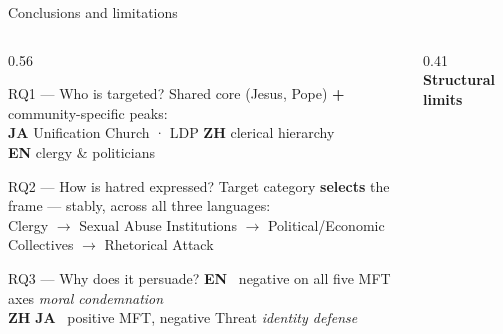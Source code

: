 \documentclass[aspectratio=169,10pt]{beamer}
\newcommand{\emphc}[1]{\textcolor{uzhaccent}{\textbf{#1}}}
\begin{document}
\begin{frame}{Conclusions and limitations}
  \begin{columns}[T,onlytextwidth]

    \begin{column}{0.56\textwidth}
      \begin{block}{RQ1 — Who is targeted?}
        \footnotesize
        Shared core (Jesus, Pope) \textbf{+} community-specific peaks:\\[0.2em]
        \textcolor{jacol}{\textbf{JA}} Unification Church · LDP \quad
        \textcolor{zhcol}{\textbf{ZH}} clerical hierarchy \quad \\
        \textcolor{enzh}{\textbf{EN}} clergy \& politicians
      \end{block}
      \vspace{0.2em}
      \begin{block}{RQ2 — How is hatred expressed?}
        \footnotesize
        Target category \emphc{selects} the frame — stably, across all three languages:\\[0.2em]
        Clergy $\!\to\!$ Sexual Abuse \enspace
        Institutions $\!\to\!$ Political/Economic \enspace
        Collectives $\!\to\!$ Rhetorical Attack
      \end{block}
      \vspace{0.2em}
      \begin{block}{RQ3 — Why does it persuade?}
        \footnotesize
        \textcolor{enzh}{\textbf{EN}} \ negative on all five MFT axes
        \hfill\textit{moral condemnation}\\[0.15em]
        \textcolor{zhcol}{\textbf{ZH}} \textcolor{jacol}{\textbf{JA}} \ positive MFT, negative Threat
        \hfill\textit{identity defense}
      \end{block}
    \end{column}

    \begin{column}{0.41\textwidth}
      \small\textbf{Structural limits}
      \vspace{0.4em}


\end{column}
\end{columns}
\end{frame}
\end{document}
